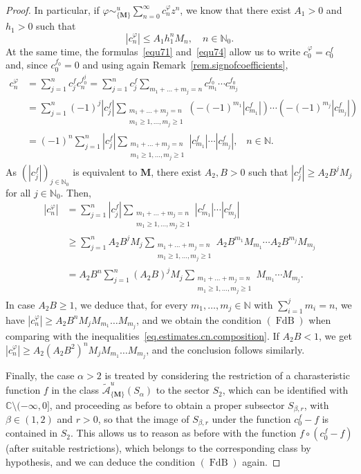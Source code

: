 \documentclass[11pt,a4paper]{article}
\theoremstyle{plain}
\theoremstyle{definition}
\newcommand{\CC}{\mathbb{C}}
\newcommand{\NN}{\mathbb{N}}
\newcommand{\M}{\mathbf{M}}
\newcommand{\m}{\boldsymbol{m}}
\let\on=\operatorname
\def\a{\alpha}
\def\b{\beta}
\begin{document}
\begin{proof}
In particular, if $\varphi\sim^u_{\{\M\}}\sum_{n=0}^\infty c_n^{\varphi}z^n$, we know that there exist $A_1>0$ and $h_1>0$ such that 
\begin{equation}\label{eq.estimates.cn.composition}
|c^{\varphi}_n|\le A_1h_1^nM_n, \quad n\in\NN_0.     
\end{equation}
At the same time, the formulas~\eqref{equ71} and~\eqref{equ74} allow us to write $c^\varphi_0=c^f_0$ and, since $c_0^{f_0}=0$ and using again Remark~\ref{rem.signofcoefficients},
\begin{align*}
c^\varphi_n&=\sum_{j=1}^{n}c^f_jc^{f_0^j}_n=
\sum_{j=1}^{n}c^f_j\sum_{m_1+\dots+m_j=n}c^{f_0}_{m_1}\cdots c^{f_0}_{m_j}\\
&=\sum_{j=1}^{n}(-1)^j|c^f_j|\sum_{\substack{m_1+\dots+m_j=n\\m_1\ge 1,\dots,m_j\ge 1}}(-(-1)^{m_1}|c^{f}_{m_1}|)\cdots (-(-1)^{m_j}|c^{f}_{m_j}|)\\
&=(-1)^n\sum_{j=1}^{n}|c^f_j|\sum_{\substack{m_1+\dots+m_j=n\\m_1\ge 1,\dots,m_j\ge 1}}|c^{f}_{m_1}|\cdots |c^{f}_{m_j}|,\;\;\;n\in\NN. 
\end{align*}
As $(|c^f_j|)_{j\in\NN_0}$ is equivalent to $\M$, there exist $A_2,B>0$ such that $|c^f_j|\geq A_2 B^j M_j$ for all $j\in\NN_0$. Then,
\begin{align*}
|c^\varphi_n|&=\sum_{j=1}^{n}|c^f_j|\sum_{\substack{m_1+\dots+m_j=n\\m_1\ge 1,\dots,m_j\ge 1}}|c^{f}_{m_1}|\cdots |c^{f}_{m_j}|\\
&\ge \sum_{j=1}^{n}A_2 B^j M_j\sum_{\substack{m_1+\dots+m_j=n\\m_1\ge 1,\dots,m_j\ge 1}}A_2 B^{m_1}M_{m_1}\cdots A_2 B^{m_j} M_{m_j}\\
&=A_2 B^n\sum_{j=1}^{n} (A_2B)^jM_j\sum_{\substack{m_1+\dots+m_j=n\\m_1\ge 1,\dots,m_j\ge 1}}M_{m_1}\cdots M_{m_j}.
\end{align*}
In case $A_2B\ge 1$, we deduce that, for every $m_1,\dots,m_j\in\NN$ with $\sum_{i=1}^jm_i=n$, we have $|c_n^{\varphi}|\ge A_2B^nM_jM_{m_1}\dots M_{m_j}$, and we obtain the condition \hyperlink{s-FdB}{$(\on{FdB})$} when comparing with the inequalities~\eqref{eq.estimates.cn.composition}. If $A_2B<1$, we get
$|c_n^{\varphi}|\ge A_2(A_2B^2)^nM_jM_{m_1}\dots M_{m_j}$, and the conclusion follows similarly.

Finally, the case $\a>2$ is treated by considering the restriction of a charasteristic function $f$ in the class $\mathcal{\widetilde{A}}^{u}_{\{\M\}} (S_\alpha)$ to the sector $S_2$, which can be identified with $\CC\setminus(-\infty,0]$, and proceeding as before to obtain a proper subsector $S_{\b,r}$, with $\b\in(1,2)$ and $r>0$, so that the image of $S_{\b,r}$ under the function $c_0^f-f$ is contained in $S_2$. This allows us to reason as before with the function $f\circ(c_0^f-f)$ (after suitable restrictions), which belongs to the corresponding class by hypothesis, and we can deduce the  condition \hyperlink{s-FdB}{$(\on{FdB})$} again.
\end{proof}
\end{document}
